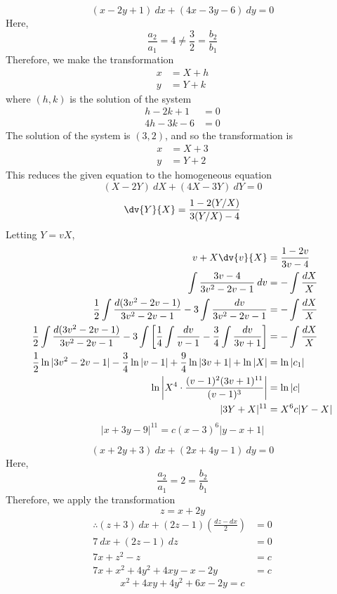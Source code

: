 \begin{example}{\[
        (x - 2y + 1) \: d{x} + (4x - 3y - 6) \: d{y} = 0
\]}{} \vspace{-20pt}
    Here, \[
        \frac{a_2}{a_1} = 4 \neq \frac{3}{2} = \frac{b_2}{b_1}
    \] Therefore, we make the transformation
    \begin{align*}
        x &= X + h \\
        y &= Y + k
    \end{align*}
    where $(h,k)$ is the solution of the system
    \begin{align*}
        h - 2k + 1 &= 0 \\
        4h - 3k - 6 &= 0
    \end{align*}
    The solution of the system is $(3,2)$, and so the transformation is
    \begin{align*}
        x &= X + 3 \\
        y &= Y + 2
    \end{align*}
    This reduces the given equation to the homogeneous equation
    \[ (X-2Y) \: d{X} + (4X-3Y) \: d{Y} = 0 \]
    \[ \dv{Y}{X} = \frac{1 - 2(Y/X)}{3(Y/X) - 4} \]
    Letting $Y = vX$,
    \begin{align*}
        v + X\dv{v}{X} &= \frac{1-2v}{3v-4} \\
        \int{ \frac{3v-4}{3v^2-2v-1} } \: d{v} &= -\int{ \frac{dX}{X} } \\
        \frac{1}{2}\int{ \frac{d(3v^2-2v-1)}{3v^2-2v-1} } - 3\int{ \frac{dv}{3v^2-2v-1} } &= -\int{ \frac{dX}{X} } \\
        \frac{1}{2}\int{ \frac{d(3v^2-2v-1)}{3v^2-2v-1} } - 3\int{ \left[ \frac{1}{4}\int{ \frac{dv}{v-1} } - \frac{3}{4}\int{ \frac{dv}{3v+1} } \right]  } &= -\int{ \frac{dX}{X} } \\
        \frac{1}{2}\ln|3v^2-2v-1| - \frac{3}{4}\ln|v-1| + \frac{9}{4}\ln|3v+1| + \ln|X| &= \ln|c_1| \\
        \ln \left| X^4 \cdot \frac{(v-1)^2(3v+1)^{11}}{(v-1)^3} \right| &= \ln|c| \\
        |3Y+X|^{11} &= X^6c|Y-X|
    \end{align*}
    \[ \boxed{ |x + 3y - 9|^{11} = c(x-3)^6|y-x+1| } \]
\end{example}

\begin{example}{\[
        (x+2y+3) \: d{x} + (2x+4y-1) \: d{y} = 0
\]}{}
    Here, \[
        \frac{a_2}{a_1} = 2 = \frac{b_2}{b_1}
    \] Therefore, we apply the transformation \[
        z = x + 2y
    \]
    \begin{align*}
        \therefore (z+3) \: dx + (2z-1) \left( \frac{dz-dx}{2} \right) &= 0 \\
        7 \: dx + (2z-1) \: dz &= 0 \\
        7x + z^2 - z &= c \\
        7x + x^2 + 4y^2 + 4xy - x - 2y &= c
    \end{align*}
    \[ \boxed{ x^2 + 4xy + 4y^2 + 6x - 2y = c  } \]
\end{example}
